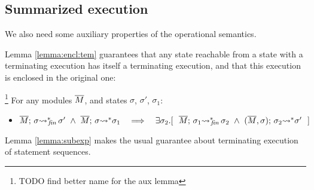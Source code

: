  
\subsection{Summarized  execution} 

\label{sect:termExecs}



\label{sect:termExecs}
We also need some auxiliary properties of the operational semantics.
 
Lemma \ref{lemma:encl:tem} guarantees that any state reachable from a state with a terminating execution has itself a terminating execution, and that this execution is enclosed in the original one:
 
 \begin{auxLemma}\footnote{TODO find better name for the aux lemma}
 \label{lemma:encl:tem}
 For any modules $\overline{M}$,   and states $\sigma$, $\sigma'$, $\sigma_1$:
\begin{itemize}
\item
$  \leadstoBoundedStarFin {\Mtwo}  {\sigma}  {\sigma'} \  \wedge \  \leadstoBoundedStar  {\Mtwo}  {\sigma}  {\sigma_1} 
\ \ \  \Longrightarrow\ \ \  %
 \exists \sigma_2.[\ \ \leadstoBoundedStarFin {\Mtwo} {\sigma_1}  {\sigma_2}  
\ \wedge\ 
\leadstoBoundedStarThree  {\Mtwo}  {\sigma_2}  {\sigma}   {\sigma'} \ \ ]$
\end{itemize}

\end{auxLemma} 
 
Lemma \ref{lemma:subexp} makes the usual guarantee about terminating execution of statement sequences.
  
